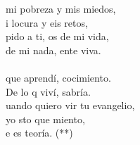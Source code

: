 \begin{cancion}
\begin{chorus}
	mi pobreza y  mis miedos, \\
	i locura y eis retos,\\
	pido a ti, os de mi vida, \\
	 de mi nada, ente viva.\\
\jump\\
	que aprendí, cocimiento. \\
	De lo q viví, sabría.\\
	uando quiero vir tu evangelio, \\
	yo sto que miento,\\
	e es teoría. (**)\\
	\end{chorus}%
	\jump\\
\end{cancion}%
